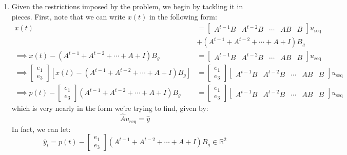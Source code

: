 \documentclass[12pt]{exam}
\newcommand{\Q}[1]{\question{\large{\textbf{#1}}}}
\begin{document}
\begin{questions}
  \Q{Bow Tie Launch}

  \begin{solution}
    \begin{enumerate}[label=(\alph*)]
      \item Given the restrictions imposed by the problem, we begin by tackling it in pieces. First, note that we can write $x(t)$ in the following form:
      \begin{align*}
        x(t) &= \begin{bmatrix} A^{t-1}B & A^{t-2}B & \cdots & AB & B \end{bmatrix}u_{\text{seq}} \\  &+ (A^{t-1} + A^{t-2} + \cdots + A + I)B_g \\
      \implies
        x(t) - (A^{t-1} + A^{t-2} + \cdots + A + I)B_g &= \begin{bmatrix} A^{t-1}B & A^{t-2}B & \cdots & AB & B \end{bmatrix}u_{\text{seq}} \\
        \implies \begin{bmatrix} e_1 \\ e_3 \end{bmatrix} [x(t) - (A^{t-1} + A^{t-2} + \cdots + A + I)B_g] &=  \begin{bmatrix} e_1 \\ e_3 \end{bmatrix}\begin{bmatrix} A^{t-1}B & A^{t-2}B & \cdots & AB & B \end{bmatrix}u_{\text{seq}}  \\
        \implies p(t) - \begin{bmatrix} e_1 \\ e_3 \end{bmatrix}(A^{t-1} + A^{t-2} + \cdots + A + I)B_g &= \begin{bmatrix} e_1 \\ e_3 \end{bmatrix}\begin{bmatrix} A^{t-1}B & A^{t-2}B & \cdots & AB & B \end{bmatrix}u_{\text{seq}}
      \end{align*}
      which is very nearly in the form we're trying to find, given by:
      \[
        \hat{A}u_{\text{seq}} = \hat{y}
      \]
      In fact, we can let:
      \[
        \hat{y}_t = p(t) - \begin{bmatrix} e_1 \\ e_3 \end{bmatrix}(A^{t-1} + A^{t-2} + \cdots + A + I)B_g \in \mathbb{R}^2
\]
\end{enumerate}
\end{solution}
\end{questions}
\end{document}
